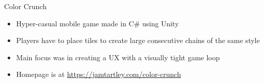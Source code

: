 \item Color Crunch
\begin{itemize}
    \item Hyper-casual mobile game made in C\# using Unity
    \item Players have to place tiles to create large consecutive chains of the same style
    \item Main focus was in creating a UX with a visually tight game loop
    \item Homepage is at \href{https://jamtartley.com/color-crunch}{https://jamtartley.com/color-crunch}
\end{itemize}
